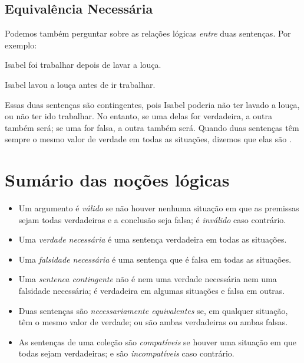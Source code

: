 \subsection{Equivalência Necessária}

Podemos também perguntar sobre as relações lógicas \emph{entre} duas sentenças.
Por exemplo:
\begin{earg}
\item[] Isabel foi trabalhar depois de lavar a louça.
\item[] Isabel lavou a louça antes de ir trabalhar.
\end{earg}
Essas duas sentenças são contingentes, pois Isabel poderia não ter lavado a louça, ou não ter ido trabalhar.
No entanto, se uma delas for verdadeira, a outra também será; se uma for falsa, a outra também será.
Quando duas sentenças têm sempre o mesmo valor de verdade em todas as situações, dizemos que elas são .

\section*{Sumário das noções lógicas}

\begin{itemize}
\item Um argumento é \textit{válido} se não houver nenhuma situação em que as premissas sejam todas verdadeiras e a conclusão seja falsa; é \textit{inválido} caso contrário.

\item Uma \textit{verdade necessária} é uma sentença verdadeira em todas as situações.

\item Uma \textit{falsidade necessária} é uma sentença que é falsa em todas as situações.

\item Uma \textit{sentenca contingente} não é nem uma verdade necessária nem uma falsidade necessária; é verdadeira em algumas situações e falsa em outras.

\item Duas sentenças são \textit{necessariamente equivalentes} se, em qualquer situação, têm o mesmo valor de verdade; ou são ambas verdadeiras ou ambas falsas.

\item As sentenças de uma coleção são \textit{compatíveis} se houver uma situação em que todas sejam verdadeiras; e são \textit{incompatíveis} caso contrário.
\end{itemize}



